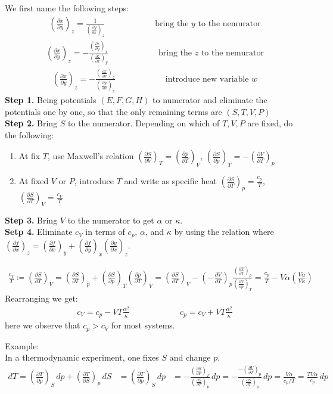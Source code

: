 \documentclass[11pt]{article}
\theoremstyle{break}
\theoremstyle{break}
\newcommand{\pd}{\partial}
\newcommand{\lr}[1]{\left( #1 \right)}
\newcommand{\example}{\color{green}Example: \color{black}}
\begin{document}
We first name the following steps:
\begin{align*}
\lr{\frac{\pd x}{\pd y}}_z = \frac{1}{\lr{\frac{\pd y}{\pd x}}_z} \qquad\qquad\qquad\text{bring the }y \text{ to the nemurator}
\end{align*}
\begin{align*}
\lr{\frac{\pd x}{\pd y}}_z = -\frac{\lr{\frac{\pd z}{\pd y}}_x}{\lr{\frac{\pd z}{\pd x}}_y} \qquad\qquad\qquad\text{bring the }z \text{ to the nemurator}
\end{align*}
\begin{align*}
\lr{\frac{\pd x}{\pd y}}_z = -\frac{\lr{\frac{\pd x}{\pd w}}_z}{\lr{\frac{\pd y}{\pd w}}_z} \qquad\qquad\qquad\text{introduce new variable }w
\end{align*}
\textbf{Step 1.} Being potentials $(E,F,G,H)$ to numerator and eliminate the potentials one by one, so that the only remaining terms are $(S,T,V,P)$\\
\textbf{Step 2.} Bring $S$ to the numerator. Depending on which of $T,V,P$ are fixed, do the following:
\begin{enumerate}[topsep=3pt,itemsep=-1ex,partopsep=1ex,parsep=1ex]
\item At fix $T$, use Maxwell's relation $\lr{\frac{\pd S}{\pd V}}_T = \lr{\frac{\pd p}{\pd T}}_V$, $\lr{\frac{\pd S}{\pd p}}_T = -\lr{\frac{\pd V}{\pd T}}_p$
\item At fixed $V$ or $P$, introduce $T$ and write as specific heat $\lr{\frac{\pd S}{\pd T}}_p = \frac{c_p}{T}$, $\lr{\frac{\pd S}{\pd T}}_V = \frac{c_V}{T}$
\end{enumerate}
\textbf{Step 3.} Bring $V$ to the numerator to get $\alpha$ or $\kappa$.\\ 
\textbf{Setp 4.} Eliminate $c_V$ in terms of $c_p$, $\alpha$, and $\kappa$ by using the relation where $\lr{\frac{\pd f}{\pd x}}_z = \lr{\frac{\pd f}{\pd x}}_y + \lr{\frac{\pd f}{\pd y}}_x\lr{\frac{\pd y}{\pd x}}_z$.

\begin{align*}
\frac{c_V}{T} \coloneqq \lr{\frac{\pd S}{\pd T}}_V = \lr{\frac{\pd S}{\pd T}}_p + \lr{\frac{\pd S}{\pd p}}_T \lr{\frac{\pd p}{\pd T}}_V
= \lr{\frac{\pd S}{\pd T}}_V -\lr{-\frac{\pd V}{\pd T}}_p \frac{\lr{\frac{\pd V}{\pd T}}_p}{\lr{\frac{\pd V}{\pd p}}_T} = \frac{c_p}{T} -V\alpha \left(\frac{V\alpha}{V\kappa} \right) 
\end{align*}
Rearranging we get:
\begin{align*}
c_V = c_p - VT \frac{\alpha^2}{\kappa} \qquad\qquad\qquad c_p = c_V + VT\frac{\alpha^2}{\kappa}
\end{align*}
here we observe that $c_p > c_V$ for most systems. 

\example\\
In a thermodynamic experiment, one fixes $S$ and change $p$. 
\begin{align*}
dT = \lr{\frac{\pd T}{\pd p}}_S \, dp + \lr{\frac{\pd T}{\pd S}}_p \, dS &= \lr{\frac{\pd T}{\pd p}}_S \, dp
&= -\frac{\lr{\frac{\pd S}{\pd P}}_T}{\lr{\frac{\pd S}{\pd T}}_p}\, dp =  -\frac{-\lr{\frac{\pd V}{\pd T}}_p}{\lr{\frac{\pd S}{\pd T}}_p}\, dp = \frac{V\alpha}{c_p/T} = \frac{TV\alpha}{c_p} \, dp
\end{align*}
\end{document}
